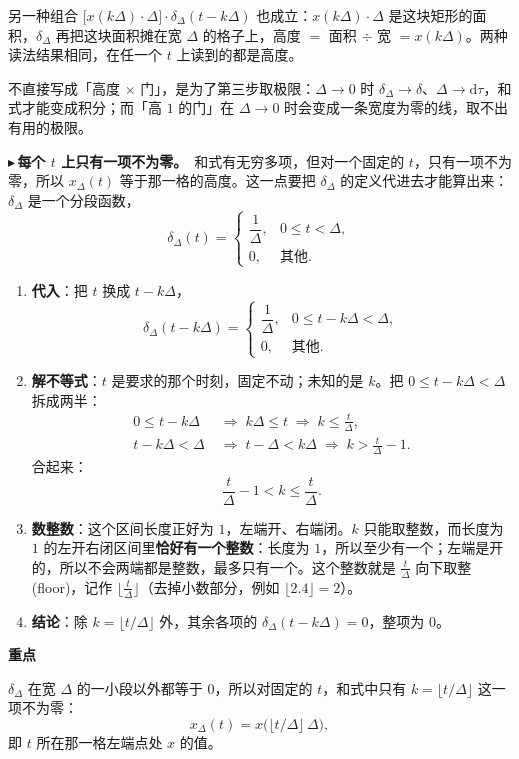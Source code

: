 \documentclass[UTF8,a4paper,11pt]{ctexart}
\newenvironment{remember}{\begin{rememberbox}\textbf{重点}\par\smallskip}{\end{rememberbox}}
\newcounter{ex}[section]
\newcommand{\point}[1]{\par\addvspace{1ex}\noindent\textcolor{ptteal}{$\blacktriangleright$\,\textbf{#1}}\ }
\begin{document}
另一种组合 $\big[x(k\Delta)\cdot\Delta\big]\cdot\delta_\Delta(t-k\Delta)$ 也成立：$x(k\Delta)\cdot\Delta$ 是这块矩形的面积，$\delta_\Delta$ 再把这块面积摊在宽 $\Delta$ 的格子上，高度 $=$ 面积 $\div$ 宽 $=x(k\Delta)$。两种读法结果相同，在任一个 $t$ 上读到的都是高度。

不直接写成「高度 $\times$ 门」，是为了第三步取极限：$\Delta\to0$ 时 $\delta_\Delta\to\delta$、$\Delta\to\mathrm{d}\tau$，和式才能变成积分；而「高 $1$ 的门」在 $\Delta\to0$ 时会变成一条宽度为零的线，取不出有用的极限。

\point{每个 $t$ 上只有一项不为零。}和式有无穷多项，但对一个固定的 $t$，只有一项不为零，所以 $x_\Delta(t)$ 等于那一格的高度。这一点要把 $\delta_\Delta$ 的定义代进去才能算出来：$\delta_\Delta$ 是一个分段函数，
\[
\delta_\Delta(t)=
\begin{cases}
\dfrac1\Delta, & 0\le t<\Delta,\\[4pt]
0, & \text{其他}.
\end{cases}
\]
\begin{enumerate}[nosep]
\item \textbf{代入}：把 $t$ 换成 $t-k\Delta$，
\[
\delta_\Delta(t-k\Delta)=
\begin{cases}
\dfrac1\Delta, & 0\le t-k\Delta<\Delta,\\[4pt]
0, & \text{其他}.
\end{cases}
\]
\item \textbf{解不等式}：$t$ 是要求的那个时刻，固定不动；未知的是 $k$。把 $0\le t-k\Delta<\Delta$ 拆成两半：
\begin{align*}
0\le t-k\Delta &\;\Longrightarrow\; k\Delta\le t \;\Longrightarrow\; k\le \frac t\Delta,\\
t-k\Delta<\Delta &\;\Longrightarrow\; t-\Delta<k\Delta \;\Longrightarrow\; k>\frac t\Delta-1.
\end{align*}
合起来：
\[
\frac t\Delta-1<k\le\frac t\Delta .
\]
\item \textbf{数整数}：这个区间长度正好为 $1$，左端开、右端闭。$k$ 只能取整数，而长度为 $1$ 的左开右闭区间里\textbf{恰好有一个整数}：长度为 $1$，所以至少有一个；左端是开的，所以不会两端都是整数，最多只有一个。这个整数就是 $\frac t\Delta$ 向下取整(floor)，记作 $\big\lfloor \frac t\Delta\big\rfloor$（去掉小数部分，例如 $\lfloor 2.4\rfloor=2$）。
\item \textbf{结论}：除 $k=\lfloor t/\Delta\rfloor$ 外，其余各项的 $\delta_\Delta(t-k\Delta)=0$，整项为 $0$。
\end{enumerate}

\begin{remember}
$\delta_\Delta$ 在宽 $\Delta$ 的一小段以外都等于 $0$，所以对固定的 $t$，和式中只有 $k=\lfloor t/\Delta\rfloor$ 这一项不为零：
\[
x_\Delta(t)=x\big(\lfloor t/\Delta\rfloor\,\Delta\big),
\]
即 $t$ 所在那一格左端点处 $x$ 的值。
\end{remember}
\end{document}
